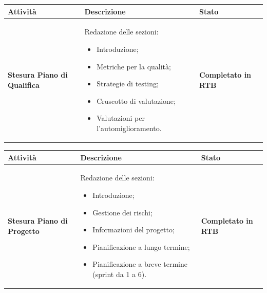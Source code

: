 \documentclass[a4paper,12pt]{article}
\begin{document}
        {\renewcommand{\arraystretch}{1.4}
            \begin{table}[H]
            \centering
            \begin{tabularx}{\textwidth}{|X|X|X|}
                \hline
                \rowcolor{gold}
		    \textbf{Attività} & \textbf{Descrizione} & \textbf{Stato}\\
                \hline
		      \textbf{Stesura Piano di Qualifica} & Redazione delle sezioni:
		    \begin{itemize}
			    \item Introduzione;
			    \item Metriche per la qualità;
			    \item Strategie di testing;
			    \item Cruscotto di valutazione;
			    \item Valutazioni per l'automiglioramento.
		    \end{itemize}		    & \textbf{Completato in RTB} \\
            \hline
                  \end{tabularx}      
            \end{table}
        }
        {\renewcommand{\arraystretch}{1.4}
            \begin{table}[H]
            \centering
            \begin{tabularx}{\textwidth}{|X|X|X|}
                \hline
                \rowcolor{gold}
		    \textbf{Attività} & \textbf{Descrizione} & \textbf{Stato}\\
                \hline
            \textbf{Stesura Piano di Progetto} & Redazione delle sezioni:
		    \begin{itemize}
			    \item Introduzione;
			    \item Gestione dei rischi;
			    \item Informazioni del progetto;
			    \item Pianificazione a lungo termine;
			    \item Pianificazione a breve termine (sprint da 1 a 6).
		    \end{itemize}		    & \textbf{Completato in RTB} \\
            \hline
                  \end{tabularx}      
            \end{table}
        }    
\end{document}
